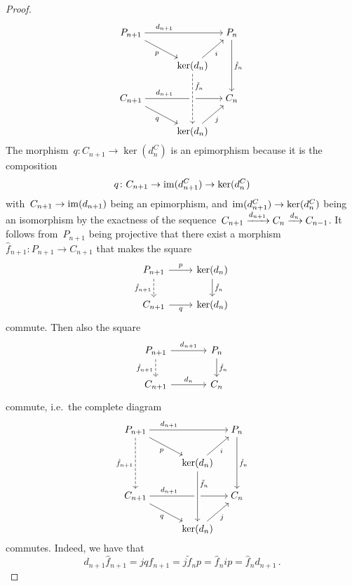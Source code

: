 \begin{proof}
  \[
    \begin{tikzcd}[column sep = small, cramped]
        P_{n+1}
        \arrow{rrr}[above, near start]{d_{n+1}}
        \arrow{drr}[below left]{p}
      & {}
      & {}
      & P_n
        \arrow{dd}[right]{\hat{f}_n}
      \\
        {}
      & {}
      & \ker(d_n)
        \arrow{ur}[below right]{i}
      & {}
      \\
        C_{n+1}
        \arrow{rrr}[above, near start]{d_{n+1}}
        \arrow{drr}[below left]{q}
      & {}
      & {}
      & C_n
      \\
        {}
      & {}
      & \ker(d_n)
        \arrow[dashed, from=uu, crossing over, "\tilde{f}_n", right, near start]
        \arrow{ur}[below right]{j}
      & {}
    \end{tikzcd}
  \]
  The morphism~$q \colon C_{n+1} \to \ker(d^C_n)$ is an epimorphism because it is the composition
  \[
    q
    \colon
    C_{n+1}
    \to
    \operatorname{im}(d^C_{n+1})
    \to
    \ker(d^C_n)
  \]
  with~$C_{n+1} \to \operatorname{im}(d_{n+1})$ being an epimorphism, and~$\operatorname{im}(d^C_{n+1}) \to \ker(d^C_n)$ being an isomorphism by the exactness of the sequence~$C_{n+1} \xrightarrow{d_{n+1}} C_n \xrightarrow{d_n} C_{n-1}$.
  It follows from~$P_{n+1}$ being projective that there exist a morphism~$\hat{f}_{n+1} \colon P_{n+1} \to C_{n+1}$ that makes the square
  \[
    \begin{tikzcd}
        P_{n+1}
        \arrow{r}[above]{p}
        \arrow[dashed]{d}[left]{\hat{f}_{n+1}}
      & \ker(d_n)
        \arrow{d}[right]{\tilde{f}_n}
      \\
        C_{n+1}
        \arrow{r}[below]{q}
      & \ker(d_n)
    \end{tikzcd}
  \]
  commute.
  Then also the square
  \[
    \begin{tikzcd}[column sep = large]
        P_{n+1}
        \arrow{r}[above]{d_{n+1}}
        \arrow[dashed]{d}[left]{\hat{f}_{n+1}}
      & P_n
        \arrow{d}[right]{\hat{f}_n}
      \\
        C_{n+1}
        \arrow{r}[above]{d_n}
      & C_n
    \end{tikzcd}
  \]
  commute, i.e.\ the complete diagram
  \[
    \begin{tikzcd}[column sep = small, cramped]
        P_{n+1}
        \arrow{rrr}[above, near start]{d_{n+1}}
        \arrow{drr}[below left]{p}
        \arrow[dashed]{dd}[left]{\hat{f}_{n+1}}
      & {}
      & {}
      & P_n
        \arrow{dd}[right]{\hat{f}_n}
      \\
        {}
      & {}
      & \ker(d_n)
        \arrow{ur}[below right]{i}
      & {}
      \\
        C_{n+1}
        \arrow{rrr}[above, near start]{d_{n+1}}
        \arrow{drr}[below left]{q}
      & {}
      & {}
      & C_n
      \\
        {}
      & {}
      & \ker(d_n)
        \arrow[from=uu, crossing over, "\tilde{f}_n", right, near start]
        \arrow{ur}[below right]{j}
      & {}
    \end{tikzcd}
  \]
  commutes.
  Indeed, we have that
  \[
      d_{n+1} \hat{f}_{n+1}
    = j q \hat{f}_{n+1}
    = j \tilde{f}_n p
    = \hat{f}_n i p
    = \hat{f}_n d_{n+1} \,.
  \]
  

\end{proof}
